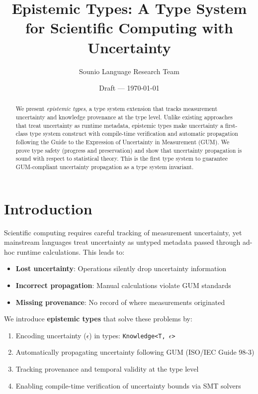 \documentclass[11pt]{article}
\title{Epistemic Types: A Type System for Scientific Computing with Uncertainty}
\author{Sounio Language Research Team}
\date{Draft --- \today}
\begin{document}
\maketitle

\begin{abstract}
We present \emph{epistemic types}, a type system extension that tracks measurement uncertainty and knowledge provenance at the type level. Unlike existing approaches that treat uncertainty as runtime metadata, epistemic types make uncertainty a first-class type system construct with compile-time verification and automatic propagation following the Guide to the Expression of Uncertainty in Measurement (GUM). We prove type safety (progress and preservation) and show that uncertainty propagation is sound with respect to statistical theory. This is the first type system to guarantee GUM-compliant uncertainty propagation as a type system invariant.
\end{abstract}

\section{Introduction}

Scientific computing requires careful tracking of measurement uncertainty, yet mainstream languages treat uncertainty as untyped metadata passed through ad-hoc runtime calculations. This leads to:
\begin{itemize}
\item \textbf{Lost uncertainty}: Operations silently drop uncertainty information
\item \textbf{Incorrect propagation}: Manual calculations violate GUM standards
\item \textbf{Missing provenance}: No record of where measurements originated
\end{itemize}

\noindent We introduce \textbf{epistemic types} that solve these problems by:
\begin{enumerate}
\item Encoding uncertainty ($\epsilon$) in types: \texttt{Knowledge<T, $\epsilon$>}
\item Automatically propagating uncertainty following GUM (ISO/IEC Guide 98-3)
\item Tracking provenance and temporal validity at the type level
\item Enabling compile-time verification of uncertainty bounds via SMT solvers
\end{enumerate}
\end{document}
